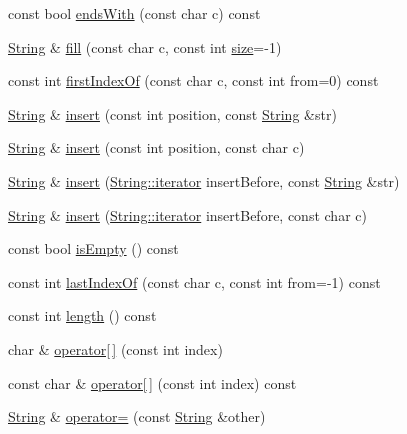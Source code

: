 \begin{DoxyCompactItemize}
\item 
const bool \hyperlink{classprism_1_1_string_aa478bddcdb9ea30ba0a8d1389296607c}{ends\+With} (const char c) const 
\item 
\hyperlink{classprism_1_1_string}{String} \& \hyperlink{classprism_1_1_string_ae7d89942e4c7ab431331400eb5489854}{fill} (const char c, const int \hyperlink{classprism_1_1_string_a603b5a90681d43adf7c6c29018e0300c}{size}=-\/1)
\item 
const int \hyperlink{classprism_1_1_string_af3b71f73c184a5f14ef91ad6e56187b7}{first\+Index\+Of} (const char c, const int from=0) const 
\item 
\hyperlink{classprism_1_1_string}{String} \& \hyperlink{classprism_1_1_string_aebf2f6e19cb77967798ba096bb559f81}{insert} (const int position, const \hyperlink{classprism_1_1_string}{String} \&str)
\item 
\hyperlink{classprism_1_1_string}{String} \& \hyperlink{classprism_1_1_string_a370a65ea4c44d5f2e3d85f441f708c3f}{insert} (const int position, const char c)
\item 
\hyperlink{classprism_1_1_string}{String} \& \hyperlink{classprism_1_1_string_ae21a3ae6bcf4bd889a4994fead75188c}{insert} (\hyperlink{classprism_1_1_string_adacc7975837e5fff95d70690777fb330}{String\+::iterator} insert\+Before, const \hyperlink{classprism_1_1_string}{String} \&str)
\item 
\hyperlink{classprism_1_1_string}{String} \& \hyperlink{classprism_1_1_string_ac9d7c3aa36ad7a33ba9f13a00456beec}{insert} (\hyperlink{classprism_1_1_string_adacc7975837e5fff95d70690777fb330}{String\+::iterator} insert\+Before, const char c)
\item 
const bool \hyperlink{classprism_1_1_string_a2f2960f59d644b2d0f390a090fa7a4ef}{is\+Empty} () const 
\item 
const int \hyperlink{classprism_1_1_string_a94a9059dc86dcfcbf409ffc83f3da2a8}{last\+Index\+Of} (const char c, const int from=-\/1) const 
\item 
const int \hyperlink{classprism_1_1_string_a7dfc72427863cefb9fe883599272ca7d}{length} () const 
\item 
char \& \hyperlink{classprism_1_1_string_a2aa545085262fc28c9199a5790bfbd0a}{operator\mbox{[}$\,$\mbox{]}} (const int index)
\item 
const char \& \hyperlink{classprism_1_1_string_ad519fe1a0696fe5c4b77808d605bc68e}{operator\mbox{[}$\,$\mbox{]}} (const int index) const 
\item 
\hyperlink{classprism_1_1_string}{String} \& \hyperlink{classprism_1_1_string_ad2c84ac36bccdb26c446d32a1615f321}{operator=} (const \hyperlink{classprism_1_1_string}{String} \&other)

\end{DoxyCompactItemize}
